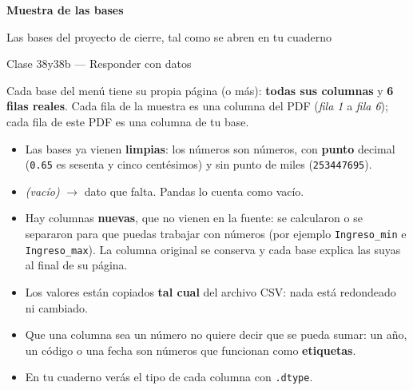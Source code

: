 \documentclass[10pt]{article}
\begin{document}
\sloppy

\begin{center}
{\Huge\bfseries\color{azuloscuro} Muestra de las bases\par}
\vspace{4pt}
{\large Las bases del proyecto de cierre, tal como se abren en tu cuaderno\par}
\vspace{2pt}
{\small Clase 38y38b --- Responder con datos\par}
\end{center}

\vspace{4pt}
Cada base del menú tiene su propia página (o más): \textbf{todas sus columnas} y \textbf{6 filas reales}. Cada fila de la muestra es una columna del PDF (\textit{fila 1} a \textit{fila 6}); cada fila de este PDF es una columna de tu base.

\begin{guiabox}
\begin{itemize}[leftmargin=1.4em,itemsep=2pt,topsep=2pt]
\item Las bases ya vienen \textbf{limpias}: los números son números, con \textbf{punto} decimal (\texttt{0.65} es sesenta y cinco centésimos) y sin punto de miles (\texttt{253447695}).
\item \textit{(vacío)} $\to$ dato que falta. Pandas lo cuenta como vacío.
\item Hay columnas \textbf{nuevas}, que no vienen en la fuente: se calcularon o se separaron para que puedas trabajar con números (por ejemplo \texttt{Ingreso\_min} e \texttt{Ingreso\_max}). La columna original se conserva y cada base explica las suyas al final de su página.
\end{itemize}
\end{guiabox}

\begin{alertabox}[Ojo]
\begin{itemize}[leftmargin=1.4em,itemsep=2pt,topsep=2pt]
\item Los valores están copiados \textbf{tal cual} del archivo CSV: nada está redondeado ni cambiado.
\item Que una columna sea un número no quiere decir que se pueda sumar: un año, un código o una fecha son números que funcionan como \textbf{etiquetas}.
\item En tu cuaderno verás el tipo de cada columna con \texttt{.dtype}.
\end{itemize}
\end{alertabox}
\end{document}

